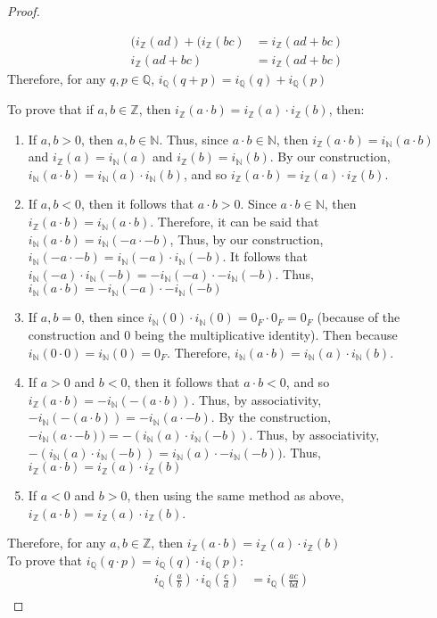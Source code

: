 \documentclass[openany, amssymb, psamsfonts]{amsart}
\newcommand{\bbN}{\mathbb{N}}
\newcommand{\bbQ}{\mathbb{Q}}
\newcommand{\bbZ}{\mathbb{Z}}
\theoremstyle{definition}
\numberwithin{equation}{section}
\begin{document}
\begin{proof}
\begin{enumerate}
\begin{align*}
    \tag{By Construction}\;\;\; (i_\bbZ(ad) + (i_\bbZ(bc) &= i_\bbZ(ad+bc)\\
    \tag{By Construction}\;\;\; i_\bbZ(ad+bc) &= i_\bbZ(ad+bc)
\end{align*}
Therefore, for any $q,p \in \bbQ$, $i_\bbQ(q+p) = i_\bbQ(q) + i_\bbQ(p)$
\end{enumerate}
To prove that if $a,b\in \bbZ$, then $i_\bbZ(a\cdot b) = i_\bbZ(a) \cdot i_\bbZ(b)$, then:
\begin{enumerate}
    \item If $a,b>0$, then $a,b \in \bbN$. Thus, since $a\cdot b \in \bbN$, then $i_\bbZ(a\cdot b) = i_\bbN (a\cdot b)$ and $i_\bbZ(a) = i_\bbN(a)$ and $i_\bbZ(b) = i_\bbN(b)$. By our construction, $i_\bbN(a\cdot b) = i_\bbN(a) \cdot i_\bbN(b)$, and so $i_\bbZ(a\cdot b) = i_\bbZ(a) \cdot i_\bbZ(b)$.
    \item If $a,b<0$, then it follows that $a\cdot b >0$. Since $a\cdot b \in \bbN$, then $i_\bbZ(a\cdot b) = i_\bbN(a\cdot b)$. Therefore, it can be said that $i_\bbN(a\cdot b) = i_\bbN(-a\cdot -b)$, Thus, by our construction, $i_\bbN(-a\cdot -b) = i_\bbN(-a) \cdot i_\bbN(-b)$. It follows that $i_\bbN(-a) \cdot i_\bbN(-b) = -i_\bbN(-a) \cdot -i_\bbN(-b)$. Thus, $i_\bbN(a\cdot b) = -i_\bbN(-a) \cdot -i_\bbN(-b)$
    \item If $a,b = 0$, then since $i_\bbN(0) \cdot i_\bbN(0) = 0_F \cdot 0_F = 0_F$ (because of the construction and 0 being the multiplicative identity). Then because $i_\bbN(0\cdot 0) = i_\bbN (0) = 0_F$. Therefore, $i_\bbN(a\cdot b) =i_\bbN(a) \cdot i_\bbN(b)$. 
    \item If $a>0$ and $b<0$, then it follows that $a\cdot b <0$, and so $i_\bbZ(a\cdot b) = -i_\bbN(-(a\cdot b))$. Thus, by associativity, $-i_\bbN(-(a\cdot b)) = -i_\bbN(a\cdot -b)$. By the construction, $-i_\bbN(a\cdot -b)) = -(i_\bbN(a) \cdot i_\bbN(-b))$. Thus, by associativity, $-(i_\bbN(a) \cdot i_\bbN(-b)) = i_\bbN(a) \cdot -i_\bbN(-b))$. Thus, $i_\bbZ(a\cdot b) = i_\bbZ(a) \cdot i_\bbZ(b)$
    \item If $a<0$ and $b>0$, then using the same method as above, $i_\bbZ(a\cdot b) = i_\bbZ(a) \cdot i_\bbZ(b)$.
\end{enumerate}
Therefore, for any $a,b \in \bbZ$, then $i_\bbZ(a\cdot b) = i_\bbZ(a) \cdot i_\bbZ(b)$\\
To prove that $i_\bbQ(q\cdot p) = i_\bbQ(q) \cdot i_\bbQ(p)$:
\begin{align*}
    \tag{WTS:} i_\bbQ(\frac{a}{b}) \cdot i_\bbQ(\frac{c}{d}) &= i_\bbQ(\frac{ac}{bd})\\

\end{align*}
\end{proof}
\end{document}
